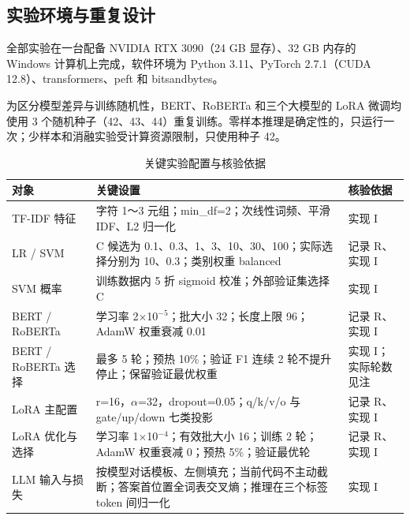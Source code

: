 \FloatBarrier\subsection{实验环境与重复设计}

全部实验在一台配备 NVIDIA RTX 3090（24 GB 显存）、32 GB 内存的 Windows 计算机上完成，软件环境为 Python 3.11、PyTorch 2.7.1（CUDA 12.8）、transformers、peft 和 bitsandbytes。

为区分模型差异与训练随机性，BERT、RoBERTa 和三个大模型的 LoRA 微调均使用 3 个随机种子（42、43、44）重复训练。零样本推理是确定性的，只运行一次；少样本和消融实验受计算资源限制，只使用种子 42。

\begin{table}[htbp]
\centering
\begin{minipage}{\textwidth}
\setlength{\tabcolsep}{3pt}
\renewcommand{\arraystretch}{1.16}
\fontsize{10.5}{13.5}\selectfont
\caption{关键实验配置与核验依据}\label{tab:3-6}
\begin{tabular}{>{\raggedright\arraybackslash}p{}>{\raggedright\arraybackslash}p{}>{\raggedright\arraybackslash}p{}}
\toprule
\textbf{对象} & \textbf{关键设置} & \textbf{核验依据} \\
\midrule
TF-\allowbreak{}IDF 特征 & 字符 1～3 元组；min\_\allowbreak{}df=2；次线性词频、平滑 IDF、L2 归一化 & 实现 I \\
LR /\allowbreak{} SVM & C 候选为 0.1、0.3、1、3、10、30、100；实际选择分别为 10、0.3；类别权重 balanced & 记录 R、实现 I \\
SVM 概率 & 训练数据内 5 折 sigmoid 校准；外部验证集选择 C & 实现 I \\
BERT /\allowbreak{} RoBERTa & 学习率 2$\times$10$^{-5}$；批大小 32；长度上限 96；AdamW 权重衰减 0.01 & 记录 R、实现 I \\
BERT /\allowbreak{} RoBERTa 选择 & 最多 5 轮；预热 10\%；验证 F1 连续 2 轮不提升停止；保留验证最优权重 & 实现 I；实际轮数见注 \\
LoRA 主配置 & r=16，$\alpha$=32，dropout=0.05；q/\allowbreak{}k/\allowbreak{}v/\allowbreak{}o 与 gate/\allowbreak{}up/\allowbreak{}down 七类投影 & 记录 R、实现 I \\
LoRA 优化与选择 & 学习率 1$\times$10$^{-4}$；有效批大小 16；训练 2 轮；AdamW 权重衰减 0；预热 5\%；验证最优轮 & 记录 R、实现 I \\
LLM 输入与损失 & 按模型对话模板、左侧填充；当前代码不主动截断；答案首位置全词表交叉熵；推理在三个标签 token 间归一化 & 实现 I \\

\end{tabular}
\end{minipage}
\end{table}
